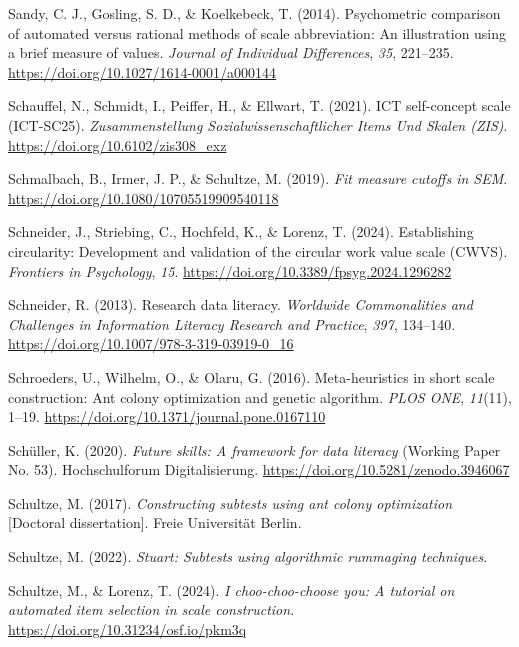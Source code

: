 \documentclass[
  12pt,
  a4paper,
  twoside]{article}
\newlength{\cslhangindent}
\newenvironment{CSLReferences}[2] %
 {\begin{list}{}{%
  \setlength{\itemindent}{0pt}
  \setlength{\leftmargin}{0pt}
  \setlength{\parsep}{0pt}
  \ifodd #1
   \setlength{\leftmargin}{\cslhangindent}
   \setlength{\itemindent}{-1\cslhangindent}
  \fi
  \setlength{\itemsep}{#2\baselineskip}}}
 {\end{list}}
\begin{document}
\begin{CSLReferences}{1}{0}
Sandy, C. J., Gosling, S. D., \& Koelkebeck, T. (2014). Psychometric comparison of automated versus rational methods of scale abbreviation: An illustration using a brief measure of values. \emph{Journal of Individual Differences}, \emph{35}, 221--235. \url{https://doi.org/10.1027/1614-0001/a000144}

Schauffel, N., Schmidt, I., Peiffer, H., \& Ellwart, T. (2021). ICT self-concept scale (ICT-SC25). \emph{Zusammenstellung Sozialwissenschaftlicher Items Und Skalen (ZIS)}. \url{https://doi.org/10.6102/zis308_exz}

Schmalbach, B., Irmer, J. P., \& Schultze, M. (2019). \emph{Fit measure cutoffs in SEM}. \url{https://doi.org/10.1080/10705519909540118}

Schneider, J., Striebing, C., Hochfeld, K., \& Lorenz, T. (2024). Establishing circularity: Development and validation of the circular work value scale (CWVS). \emph{Frontiers in Psychology}, \emph{15}. \url{https://doi.org/10.3389/fpsyg.2024.1296282}

Schneider, R. (2013). Research data literacy. \emph{Worldwide Commonalities and Challenges in Information Literacy Research and Practice}, \emph{397}, 134--140. \url{https://doi.org/10.1007/978-3-319-03919-0_16}

Schroeders, U., Wilhelm, O., \& Olaru, G. (2016). Meta-heuristics in short scale construction: Ant colony optimization and genetic algorithm. \emph{PLOS ONE}, \emph{11}(11), 1--19. \url{https://doi.org/10.1371/journal.pone.0167110}

Schüller, K. (2020). \emph{Future skills: A framework for data literacy} (Working Paper No. 53). Hochschulforum Digitalisierung. \url{https://doi.org/10.5281/zenodo.3946067}

Schultze, M. (2017). \emph{Constructing subtests using ant colony optimization} {[}Doctoral dissertation{]}. Freie Universität Berlin.

Schultze, M. (2022). \emph{Stuart: Subtests using algorithmic rummaging techniques}.

Schultze, M., \& Lorenz, T. (2024). \emph{I choo-choo-choose you: A tutorial on automated item selection in scale construction}. \url{https://doi.org/10.31234/osf.io/pkm3q}


\end{CSLReferences}
\end{document}
